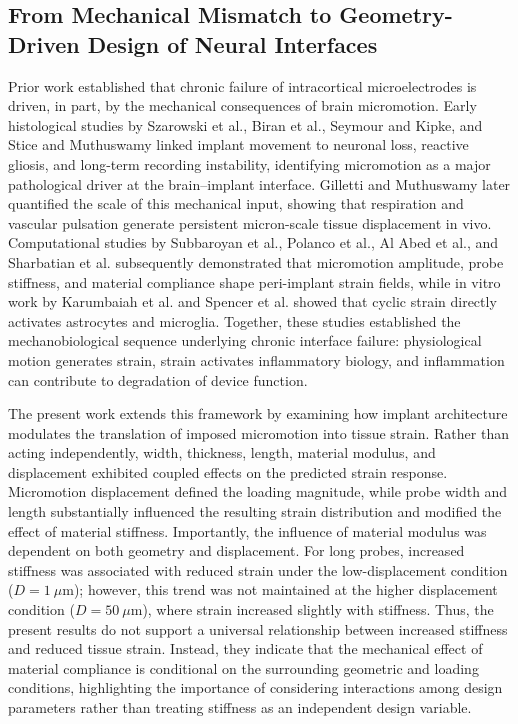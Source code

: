 \documentclass[fleqn,10pt]{wlscirep}
\begin{document}
\subsection{From Mechanical Mismatch to Geometry-Driven Design of Neural Interfaces}

Prior work established that chronic failure of intracortical microelectrodes is driven, in part, by the mechanical consequences of brain micromotion. Early histological studies by Szarowski et al.\cite{Szarowski2003}, Biran et al.\cite{Biran2005}, Seymour and Kipke\cite{Seymour2007}, and Stice and Muthuswamy\cite{Stice2009} linked implant movement to neuronal loss, reactive gliosis, and long-term recording instability, identifying micromotion as a major pathological driver at the brain--implant interface. Gilletti and Muthuswamy\cite{Gilletti2006} later quantified the scale of this mechanical input, showing that respiration and vascular pulsation generate persistent micron-scale tissue displacement in vivo. Computational studies by Subbaroyan et al.\cite{Subbaroyan2005}, Polanco et al.\cite{Polanco2012}, Al Abed et al.\cite{AlAbed2022}, and Sharbatian et al.\cite{Sharbatian2025} subsequently demonstrated that micromotion amplitude, probe stiffness, and material compliance shape peri-implant strain fields, while in vitro work by Karumbaiah et al.\cite{Karumbaiah2012} and Spencer et al.\cite{Spencer2017} showed that cyclic strain directly activates astrocytes and microglia. Together, these studies established the mechanobiological sequence underlying chronic interface failure: physiological motion generates strain, strain activates inflammatory biology, and inflammation can contribute to degradation of device function.

The present work extends this framework by examining how implant architecture modulates the translation of imposed micromotion into tissue strain. Rather than acting independently, width, thickness, length, material modulus, and displacement exhibited coupled effects on the predicted strain response. Micromotion displacement defined the loading magnitude, while probe width and length substantially influenced the resulting strain distribution and modified the effect of material stiffness. Importantly, the influence of material modulus was dependent on both geometry and displacement. For long probes, increased stiffness was associated with reduced strain under the low-displacement condition ($D = 1~\mu\text{m}$); however, this trend was not maintained at the higher displacement condition ($D = 50~\mu\text{m}$), where strain increased slightly with stiffness. Thus, the present results do not support a universal relationship between increased stiffness and reduced tissue strain. Instead, they indicate that the mechanical effect of material compliance is conditional on the surrounding geometric and loading conditions, highlighting the importance of considering interactions among design parameters rather than treating stiffness as an independent design variable.
\end{document}
